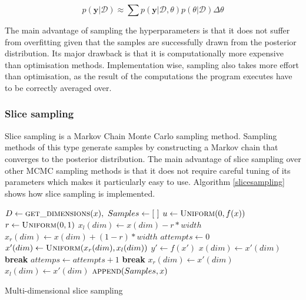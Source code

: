 \documentclass[a4paper,12pt,twoside,openright]{report}
\newcommand{\Break}{\State \textbf{break} }
\begin{document}
\begin{equation}
p(\mathbf{y}|\mathcal{D}) \approx \sum p(\mathbf{y}|\mathcal{D}, \theta)p(\theta|\mathcal{D}) \Delta\theta
\end{equation}

The main advantage of sampling the hyperparameters is that it does not suffer from overfitting given that the samples are successfully drawn from the posterior distribution. Its major drawback is that it is computationally more expensive than optimisation methods. Implementation wise, sampling also takes more effort than optimisation, as the result of the computations the program executes have to be correctly averaged over.

\subsubsection{Slice sampling}

Slice sampling \cite{MacKay:2002:ITI:971143, neal2003} is a Markov Chain Monte Carlo sampling method. Sampling methods of this type generate samples by constructing a Markov chain that converges to the posterior distribution. The main advantage of slice sampling over other MCMC sampling methods is that it does not require careful tuning of its parameters which makes it particularly easy to use. Algorithm \ref{slicesampling} shows how slice sampling is implemented.


\begin{algorithm}
\begin{algorithmic}[1]
\State $D\gets \Call{get\_dimensions}{x},\ Samples\gets[\ ]$
\State $u\gets \Call{Uniform}{0, f(x)}$
\State $r\gets \Call{Uniform}{0, 1}$
\State $x_l(dim)\gets x(dim) - r * width$
\State $x_r(dim)\gets x(dim) + (1 - r) * width$
\State $attempts\gets 0$
\Loop
\State $x'(dim) \gets \Call{Uniform}{x_r(dim), x_l(dim)}$
\State $y'\gets f(x')$
  \State $x(dim)\gets x'(dim)$
  \Break
\Else
  \State $attemps \gets attempts + 1$
    \Break
    \State $x_r(dim) \gets x'(dim)$
    \State $x_l(dim) \gets x'(dim)$
  \EndIf
\EndIf
\EndLoop
\EndFor
\State $\Call{append}{Samples, x}$
\EndFor
\EndProcedure
\end{algorithmic}
\caption{Multi-dimensional slice sampling}
\label{slicesampling}
\end{algorithm}
\end{document}
